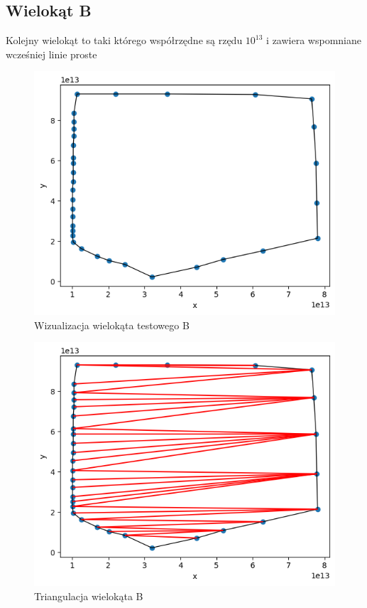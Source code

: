 \documentclass[a4paper]{article}
\begin{document}
    \subsection{Wielokąt B}
    Kolejny wielokąt to taki którego współrzędne są rzędu $10^{13}$ i zawiera wspomniane wcześniej
    linie proste
    \begin{figure}[H]
        \centering
        \includegraphics[width=.65\textwidth]{test_b_poly.png}
        \caption{Wizualizacja wielokąta testowego B}
        \label{fig:test_b_poly}
    \end{figure}
    \begin{figure}[H]
        \centering
        \includegraphics[width=.65\textwidth]{test_b_tri.png}
        \caption{Triangulacja wielokąta B}
        \label{fig:test_b_tri}
    \end{figure}
\end{document}
